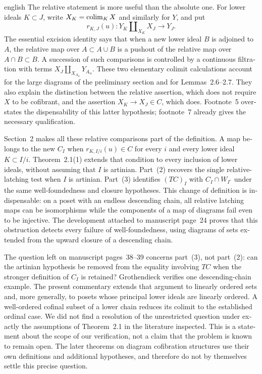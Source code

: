 \begin{otherlanguage}{english}
\begin{otherlanguage*}{english}
The relative statement is more useful than the absolute one. For lower ideals $K\subset J$, write $X_K=\mathop{\rm colim}_{K}X$ and similarly for $Y$, and put
\[
 r_{K,J}(u):Y_K\amalg_{X_K}X_J\longrightarrow Y_J.
\]
The essential excision identity says that when a new lower ideal $B$ is adjoined to $A$, the relative map over $A\subset A\cup B$ is a pushout of the relative map over $A\cap B\subset B$. A succession of such comparisons is controlled by a continuous filtration with terms $X_J\amalg_{X_{A_\alpha}}Y_{A_\alpha}$. These two elementary colimit calculations account for the large diagrams of the preliminary section and for Lemmas~2.6--2.7. They also explain the distinction between the relative assertion, which does not require $X$ to be cofibrant, and the assertion $X_K\to X_J\in C$, which does. Footnote~5 overstates the dispensability of this latter hypothesis; footnote~7 already gives the necessary qualification.

Section~2 makes all these relative comparisons part of the definition. A map belongs to the new $C_I$ when $r_{K,I/i}(u)\in C$ for every $i$ and every lower ideal $K\subset I/i$. Theorem~2.1(1) extends that condition to every inclusion of lower ideals, without assuming that $I$ is artinian. Part~(2) recovers the single relative-latching test when $I$ is artinian. Part~(3) identifies $(TC)_I$ with $C_I\cap W_{I^\circ}$ under the same well-foundedness and closure hypotheses. This change of definition is indispensable: on a poset with an endless descending chain, all relative latching maps can be isomorphisms while the components of a map of diagrams fail even to be injective. The development attached to manuscript page~24 proves that this obstruction detects every failure of well-foundedness, using diagrams of sets extended from the upward closure of a descending chain.

The question left on manuscript pages~38--39 concerns part~(3), not part~(2): can the artinian hypothesis be removed from the equality involving $TC$ when the stronger definition of $C_I$ is retained? Grothendieck verifies one descending-chain example. The present commentary extends that argument to linearly ordered sets and, more generally, to posets whose principal lower ideals are linearly ordered. A well-ordered cofinal subset of a lower chain reduces its colimit to the established ordinal case. We did not find a resolution of the unrestricted question under exactly the assumptions of Theorem~2.1 in the literature inspected. This is a statement about the scope of our verification, not a claim that the problem is known to remain open. The later theorems on diagram cofibration structures use their own definitions and additional hypotheses, and therefore do not by themselves settle this precise question.


\end{otherlanguage*}
\end{otherlanguage}
